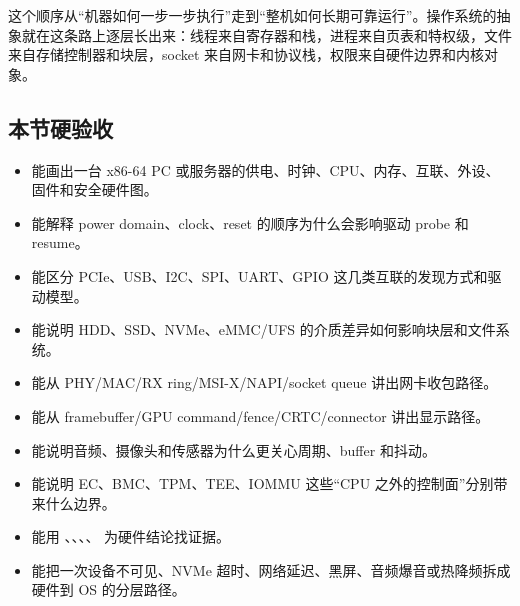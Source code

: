 这个顺序从“机器如何一步一步执行”走到“整机如何长期可靠运行”。操作系统的抽象就在这条路上逐层长出来：线程来自寄存器和栈，进程来自页表和特权级，文件来自存储控制器和块层，socket 来自网卡和协议栈，权限来自硬件边界和内核对象。

\subsection{本节硬验收}

\begin{rubricbox}
\begin{itemize}
\tightlist
\item 能画出一台 x86-64 PC 或服务器的供电、时钟、CPU、内存、互联、外设、固件和安全硬件图。
\item 能解释 power domain、clock、reset 的顺序为什么会影响驱动 probe 和 resume。
\item 能区分 PCIe、USB、I2C、SPI、UART、GPIO 这几类互联的发现方式和驱动模型。
\item 能说明 HDD、SSD、NVMe、eMMC/UFS 的介质差异如何影响块层和文件系统。
\item 能从 PHY/MAC/RX ring/MSI-X/NAPI/socket queue 讲出网卡收包路径。
\item 能从 framebuffer/GPU command/fence/CRTC/connector 讲出显示路径。
\item 能说明音频、摄像头和传感器为什么更关心周期、buffer 和抖动。
\item 能说明 EC、BMC、TPM、TEE、IOMMU 这些“CPU 之外的控制面”分别带来什么边界。
\item 能用 、、、、 为硬件结论找证据。
\item 能把一次设备不可见、NVMe 超时、网络延迟、黑屏、音频爆音或热降频拆成硬件到 OS 的分层路径。
\end{itemize}
\end{rubricbox}
